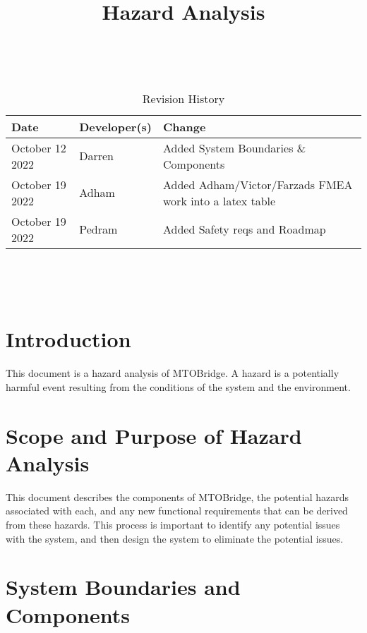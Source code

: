 \documentclass{article}
\title{Hazard Analysis\\\progname}
\author{\authname}
\date{}
\begin{document}
\maketitle
\thispagestyle{empty}

~\newpage


\begin{table}[hp]
\caption{Revision History} \label{TblRevisionHistory}
\begin{tabularx}{\textwidth}{llX}
\toprule
\textbf{Date} & \textbf{Developer(s)} & \textbf{Change}\\
\midrule
October 12 2022 & Darren & Added System Boundaries \& Components\\
October 19 2022& Adham & Added Adham/Victor/Farzads FMEA work into a latex table\\
October 19 2022& Pedram & Added Safety reqs and Roadmap\\

\bottomrule
\end{tabularx}
\end{table}

~\newpage

\tableofcontents

~\newpage




\section{Introduction}

This document is a hazard analysis of MTOBridge. A hazard is a potentially harmful event resulting
from the conditions of the system and the environment.

\section{Scope and Purpose of Hazard Analysis}

This document describes the components of MTOBridge, the potential hazards associated with each, and 
any new functional requirements that can be derived from these hazards. This process is important to 
identify any potential issues with the system, and then design the system to eliminate the potential issues.

\section{System Boundaries and Components}
\end{document}
